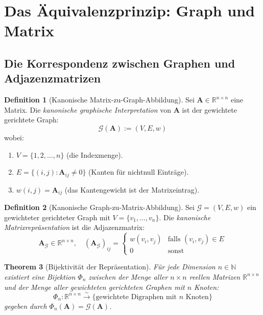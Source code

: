\documentclass[12pt, a4paper]{article}
\newtheorem{theorem}{Theorem}[section]
\theoremstyle{definition}
\newtheorem{definition}[theorem]{Definition}
\theoremstyle{remark}
\newcommand{\R}{\mathbb{R}}
\newcommand{\N}{\mathbb{N}}
\newcommand{\vA}{\bm{A}}
\newcommand{\Graph}{\mathcal{G}}
\begin{document}
\section{Das Äquivalenzprinzip: Graph und Matrix}
\label{sec:aequivalenzprinzip}

\subsection{Die Korrespondenz zwischen Graphen und Adjazenzmatrizen}
\label{subsec:korrespondenz}

\begin{definition}[Kanonische Matrix-zu-Graph-Abbildung]
\label{def:kanonische_abbildung}
Sei $\vA \in \R^{n \times n}$ eine Matrix. Die \emph{kanonische graphische Interpretation} von $\vA$ ist der gewichtete gerichtete Graph:
\[
  \Graph(\vA) := (V, E, w)
\]
wobei:
\begin{enumerate}[label=(\alph*)]
  \item $V = \{1, 2, \ldots, n\}$ (die Indexmenge).
  \item $E = \{(i, j) : \vA_{ij} \neq 0\}$ (Kanten für nichtnull Einträge).
  \item $w(i, j) = \vA_{ij}$ (das Kantengewicht ist der Matrixeintrag).
\end{enumerate}
\end{definition}

\begin{definition}[Kanonische Graph-zu-Matrix-Abbildung]
\label{def:kanonische_graph_matrix}
Sei $\Graph = (V, E, w)$ ein gewichteter gerichteter Graph mit $V = \{v_1, \ldots, v_n\}$. Die \emph{kanonische Matrixrepräsentation} ist die Adjazenzmatrix:
\[
  \vA_{\Graph} \in \R^{n \times n}, \quad (\vA_{\Graph})_{ij} = \begin{cases}
    w(v_i, v_j) & \text{falls } (v_i, v_j) \in E \\
    0 & \text{sonst}
  \end{cases}
\]
\end{definition}

\begin{theorem}[Bijektivität der Repräsentation]
\label{thm:bijektivitaet}
Für jede Dimension $n \in \N$ existiert eine Bijektion $\Phi_n$ zwischen der Menge aller $n \times n$ reellen Matrizen $\R^{n \times n}$ und der Menge aller gewichteten gerichteten Graphen mit $n$ Knoten:
\[
  \Phi_n: \R^{n \times n} \xrightarrow{\sim} \{\text{gewichtete Digraphen mit } n \text{ Knoten}\}
\]
gegeben durch $\Phi_n(\vA) = \Graph(\vA)$.
\end{theorem}
\end{document}
